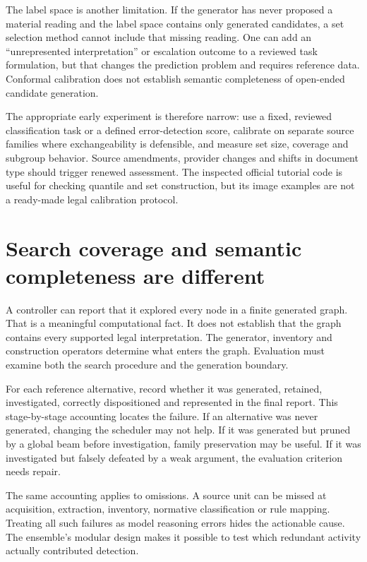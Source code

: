 \documentclass[12pt,a4paper,oneside,openany]{book}
\begin{document}
The label space is another limitation. If the generator has never proposed a
material reading and the label space contains only generated candidates, a set
selection method cannot include that missing reading. One can add an
``unrepresented interpretation'' or escalation outcome to a reviewed task
formulation, but that changes the prediction problem and requires reference data.
Conformal calibration does not establish semantic completeness of open-ended
candidate generation.

The appropriate early experiment is therefore narrow: use a fixed, reviewed
classification task or a defined error-detection score, calibrate on separate
source families where exchangeability is defensible, and measure set size,
coverage and subgroup behavior. Source amendments, provider changes and shifts in
document type should trigger renewed assessment. The inspected official tutorial
code is useful for checking quantile and set construction, but its image examples
are not a ready-made legal calibration protocol.

\section{Search coverage and semantic completeness are different}
\label{merge:M09:10}


A controller can report that it explored every node in a finite generated graph.
That is a meaningful computational fact. It does not establish that the graph
contains every supported legal interpretation. The generator, inventory and
construction operators determine what enters the graph. Evaluation must examine
both the search procedure and the generation boundary.

For each reference alternative, record whether it was generated, retained,
investigated, correctly dispositioned and represented in the final report. This
stage-by-stage accounting locates the failure. If an alternative was never
generated, changing the scheduler may not help. If it was generated but pruned by
a global beam before investigation, family preservation may be useful. If it was
investigated but falsely defeated by a weak argument, the evaluation criterion
needs repair.

The same accounting applies to omissions. A source unit can be missed at
acquisition, extraction, inventory, normative classification or rule mapping.
Treating all such failures as model reasoning errors hides the actionable cause.
The ensemble's modular design makes it possible to test which redundant activity
actually contributed detection.
\end{document}
